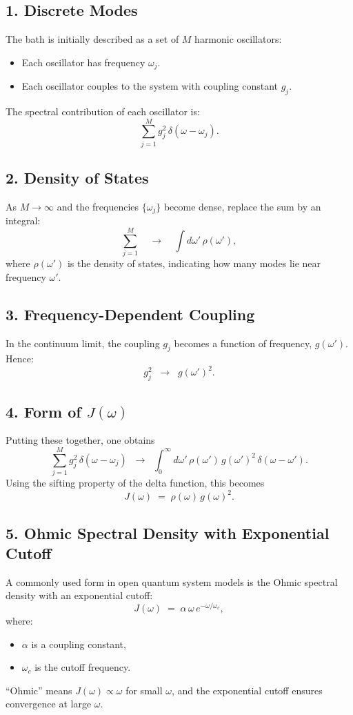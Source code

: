\subsection*{1. Discrete Modes}
The bath is initially described as a set of $M$ harmonic oscillators:
\begin{itemize}
  \item Each oscillator has frequency $\omega_j$.
  \item Each oscillator couples to the system with coupling constant $g_j$.
\end{itemize}
The spectral contribution of each oscillator is:
\[
\sum_{j=1}^{M} g_j^2\,\delta(\omega - \omega_j).
\]

\subsection*{2. Density of States}
As $M \to \infty$ and the frequencies $\{\omega_j\}$ become dense, replace the sum by an integral:
\[
\sum_{j=1}^{M} \quad \longrightarrow \quad \int d\omega'\,\rho(\omega'),
\]
where $\rho(\omega')$ is the density of states, indicating how many modes lie near frequency $\omega'$.

\subsection*{3. Frequency-Dependent Coupling}
In the continuum limit, the coupling $g_j$ becomes a function of frequency, $g(\omega')$. Hence:
\[
g_j^2 \;\;\longrightarrow\;\; g(\omega')^2.
\]

\subsection*{4. Form of $J(\omega)$}
Putting these together, one obtains
\[
\sum_{j=1}^{M} g_j^2\,\delta(\omega - \omega_j)
\;\;\longrightarrow\;\;
\int_{0}^{\infty} d\omega'\,\rho(\omega')\,g(\omega')^2\,\delta(\omega - \omega').
\]
Using the sifting property of the delta function, this becomes
\[
J(\omega) \;=\; \rho(\omega)\,g(\omega)^2.
\]

\subsection*{5. Ohmic Spectral Density with Exponential Cutoff}
A commonly used form in open quantum system models is the Ohmic spectral density with an exponential cutoff:
\[
J(\omega) \;=\; \alpha \,\omega\, e^{-\omega/\omega_c},
\]
where:
\begin{itemize}
  \item $\alpha$ is a coupling constant,
  \item $\omega_c$ is the cutoff frequency.
\end{itemize}
``Ohmic'' means $J(\omega) \propto \omega$ for small $\omega$, and the exponential cutoff ensures convergence at large $\omega$.
